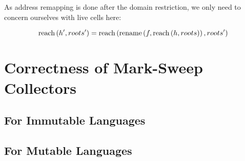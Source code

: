 \begin{lemma}
  As address remapping is done after the domain restriction, we only
  need to concern ourselves with live cells here:

  \[\mathrm{reach}\left(h', roots'\right) = \mathrm{reach}\left(\mathrm{rename}\left(f, \mathrm{reach}\left(h, roots\right)\right), roots'\right)\]
\end{lemma}

\section{Correctness of Mark-Sweep Collectors}


\subsection{For Immutable Languages}


\subsection{For Mutable Languages}

